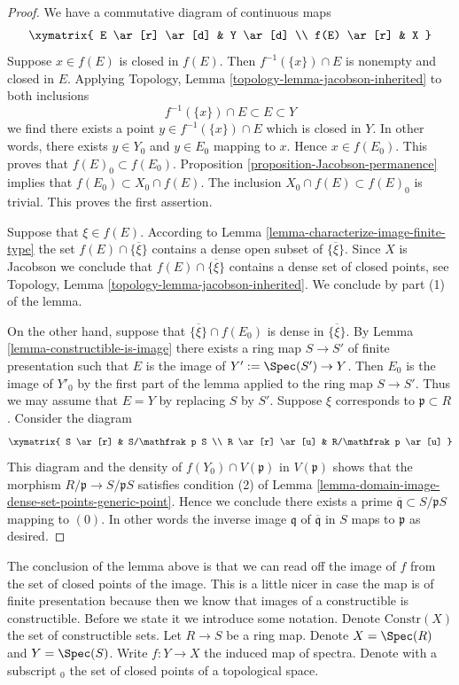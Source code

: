 \begin{proof}
We have a commutative diagram of continuous maps
$$
\xymatrix{
E \ar[r] \ar[d] & Y \ar[d] \\
f(E) \ar[r] & X
}
$$
Suppose $x \in f(E)$ is closed in $f(E)$. Then $f^{-1}(\{x\})\cap E$
is nonempty and closed in $E$. Applying
Topology, Lemma \ref{topology-lemma-jacobson-inherited}
to both inclusions
$$
f^{-1}(\{x\}) \cap E \subset E \subset Y
$$
we find there exists a point $y \in f^{-1}(\{x\}) \cap E$ which is
closed in $Y$. In other words, there exists $y \in Y_0$ and $y \in E_0$
mapping to $x$. Hence $x \in f(E_0)$.
This proves that $f(E)_0 \subset f(E_0)$.
Proposition \ref{proposition-Jacobson-permanence} implies that
$f(E_0) \subset X_0 \cap f(E)$. The inclusion
$X_0 \cap f(E) \subset f(E)_0$ is trivial. This proves the
first assertion.

\medskip\noindent
Suppose that $\xi \in f(E)$. According to
Lemma \ref{lemma-characterize-image-finite-type}
the set $f(E) \cap \overline{\{\xi\}}$ contains a dense
open subset of $\overline{\{\xi\}}$. Since $X$ is Jacobson
we conclude that $f(E) \cap \overline{\{\xi\}}$ contains a
dense set of closed points, see Topology,
Lemma \ref{topology-lemma-jacobson-inherited}.
We conclude by part (1) of the lemma.

\medskip\noindent
On the other hand, suppose that $\overline{\{\xi\}} \cap f(E_0)$
is dense in $\overline{\{\xi\}}$. By
Lemma \ref{lemma-constructible-is-image}
there exists a ring map $S \to S'$ of finite presentation
such that $E$ is the image of $Y' := \Spec(S') \to Y$.
Then $E_0$ is the image of $Y'_0$ by the first part of the
lemma applied to the ring map $S \to S'$. Thus we may assume that
$E = Y$ by replacing $S$ by $S'$. Suppose $\xi$ corresponds
to $\mathfrak p \subset R$. Consider the diagram
$$
\xymatrix{
S \ar[r] & S/\mathfrak p S \\
R \ar[r] \ar[u] & R/\mathfrak p \ar[u]
}
$$
This diagram and the density of $f(Y_0) \cap V(\mathfrak p)$
in $V(\mathfrak p)$
shows that the morphism $R/\mathfrak p \to S/\mathfrak p S$
satisfies condition (2) of
Lemma \ref{lemma-domain-image-dense-set-points-generic-point}.
Hence we conclude
there exists a prime $\overline{\mathfrak q} \subset S/\mathfrak pS$
mapping to $(0)$. In other words the inverse image $\mathfrak q$
of $\overline{\mathfrak q}$ in $S$ maps to $\mathfrak p$ as desired.
\end{proof}

\noindent
The conclusion of the lemma above is that we can read off
the image of $f$ from the set of closed points of the image.
This is a little nicer in case the map is of finite presentation
because then we know that images of a constructible is constructible.
Before we state it we introduce some notation.
Denote $\text{Constr}(X)$ the set of constructible sets.
Let $R \to S$ be a ring map.
Denote $X = \Spec(R)$ and $Y = \Spec(S)$.
Write $f : Y \to X$ the induced map of spectra.
Denote with a subscript ${}_0$ the set
of closed points of a topological space.


